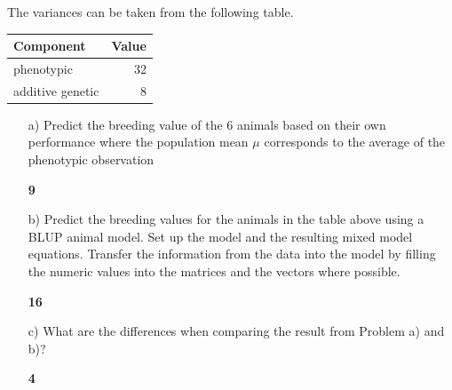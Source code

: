 \documentclass[]{article}
\newcommand{\points}[1]
{\begin{flushright}\textbf{#1}\end{flushright}}
\begin{document}
The variances can be taken from the following table.

\begin{longtable}[]{@{}lr@{}}
\toprule
Component & Value\tabularnewline
\midrule
\endhead
phenotypic & 32\tabularnewline
additive genetic & 8\tabularnewline
\bottomrule
\end{longtable}

\begin{enumerate}
\item[a)] Predict the breeding value of the 6 animals based on their own performance where the population mean $\mu$ corresponds to the average of the phenotypic observation 
\points{9}
\end{enumerate}

\clearpage
\pagebreak

\begin{enumerate}
\item[b)] Predict the breeding values for the animals in the table above using a BLUP animal model. Set up the model and the resulting mixed model equations. Transfer the information from the data into the model by filling the numeric values into the matrices and the vectors where possible. 
\points{16}
\end{enumerate}

\clearpage
\pagebreak

\begin{enumerate}
\item[c)] What are the differences when comparing the result from Problem a) and b)?
\points{4}
\end{enumerate}
\end{document}
